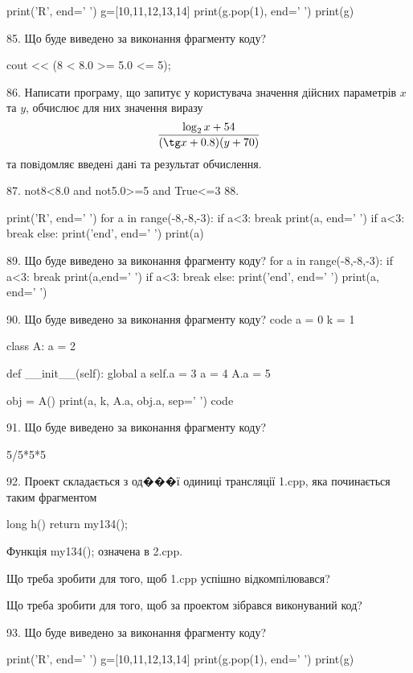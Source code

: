 \documentclass[11pt]{article}
\begin{document}
print('R', end=' ')
g=[10,11,12,13,14]
print(g.pop(1), end=' ')
print(g)


85. Що буде виведено за виконання фрагменту коду?

cout << (8 < 8.0 >= 5.0 <= 5);

86. 
Написати програму, що запитує у користувача значення дійсних параметрів $x$ та $y$, обчислює для них значення виразу 
$$\frac{\log_{2} x + 54}{(\tg x + 0.8) (y + 70)}$$ 
та повiдомляє введенi данi та результат обчислення.


87. 
not8<8.0 and not5.0>=5 and True<=3
88. 

print('R', end=' ')
for a in range(-8,-8,-3):
    if a<3:
        break
        print(a, end=' ')
    if a<3:
        break
    else:
        print('end', end=' ')
    print(a)

89. Що буде виведено за виконання фрагменту коду?
for a in range(-8,-8,-3):
    if a<3:
        break
        print(a,end=' ')
    if a<3:
        break
else:
    print('end', end=' ')
print(a, end=' ')

90. Що буде виведено за виконання фрагменту коду?
code
a = 0
k = 1

class A:
    a = 2
    
    def __init__(self):
global a        self.a = 3
        a = 4
        A.a = 5

obj = A()
print(a, k, A.a, obj.a, sep=' ')
code

91. Що буде виведено за виконання фрагменту коду?

5/5*5*5

92. 
Проект складається з од���ї одиниці трансляції 1.cpp, яка починається таким фрагментом\par
long h(){ return my134();}\par
Функція my134(); означена в 2.cpp.\par
Що треба зробити для того, щоб 1.cpp успішно відкомпілювався?\par\vspace{1.5cm}
Що треба зробити для того, щоб за проектом зібрався виконуваний код?\par

93. Що буде виведено за виконання фрагменту коду?

print('R', end=' ')
g=[10,11,12,13,14]
print(g.pop(1), end=' ')
print(g)
\end{document}
